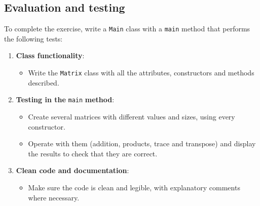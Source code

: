 \subsection{Evaluation and testing}

To complete the exercise, write a \texttt{Main} class with a \texttt{main} method that performs the following tests:

\begin{enumerate}

    \item \textbf{Class functionality}:

        \begin{itemize}

            \item Write the \texttt{Matrix} class with all the attributes, constructors and methods described.

        \end{itemize}

    \item \textbf{Testing in the} \texttt{main} \textbf{method}:

        \begin{itemize}

            \item Create several matrices with different values and sizes, using every constructor.

            \item Operate with them (addition, products, trace and transpose) and display the results to check that they are correct.

        \end{itemize}

    \item \textbf{Clean code and documentation}:

        \begin{itemize}

            \item Make sure the code is clean and legible, with explanatory comments where necessary.

        \end{itemize}

\end{enumerate}
